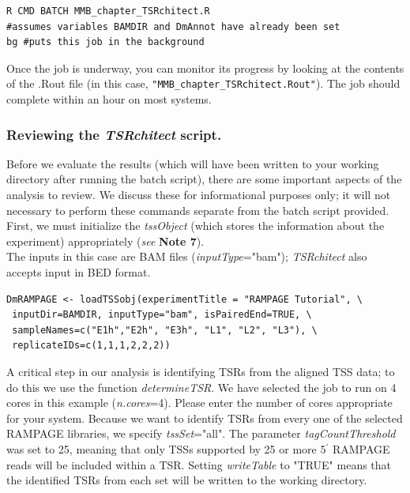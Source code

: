 \documentclass[runningheads,a4paper]{llncs}
\begin{document}
\begin{linenumbers}
\noindent
\begin{verbatim}
R CMD BATCH MMB_chapter_TSRchitect.R
#assumes variables BAMDIR and DmAnnot have already been set
bg #puts this job in the background
\end{verbatim}

\noindent
Once the job is underway, you can monitor its progress by looking at the contents of the .Rout file (in this case, \texttt{"MMB\_chapter\_TSRchitect.Rout"}). 
The job should complete within an hour on most systems.\\

\subsubsection{Reviewing the \textit{TSRchitect} script.} 
Before we evaluate the results (which will have been written to your working directory after running the batch script), there are some important aspects of the analysis to review. 
We discuss these for informational purposes only; it will not necessary to perform these commands separate from the batch script provided.
First, we must initialize the \textit{tssObject} (which stores the information about the experiment) appropriately (\textit{see} \textbf{Note 7}).\\

\noindent
The inputs in this case are BAM files (\textit{inputType}="bam"); \textit{TSRchitect} also accepts input in BED format.

\noindent
\begin{verbatim}
DmRAMPAGE <- loadTSSobj(experimentTitle = "RAMPAGE Tutorial", \
 inputDir=BAMDIR, inputType="bam", isPairedEnd=TRUE, \
 sampleNames=c("E1h","E2h", "E3h", "L1", "L2", "L3"), \
 replicateIDs=c(1,1,1,2,2,2))
\end{verbatim}

\noindent
A critical step in our analysis is identifying TSRs from the aligned TSS data; to do this we use the function \textit{determineTSR}. 
We have selected the job to run on 4 cores in this example (\textit{n.cores}=4). 
Please enter the number of cores appropriate for your system.
Because we want to identify TSRs from every one of the selected RAMPAGE libraries, we specify \textit{tssSet}="all".
The parameter \textit{tagCountThreshold} was set to 25, meaning that only TSSs supported by 25 or more 5$^\prime$ RAMPAGE reads will be included within a TSR.
Setting \textit{writeTable} to "TRUE" means that the identified TSRs from each set will be written to the working directory. 


\end{linenumbers}
\end{document}
